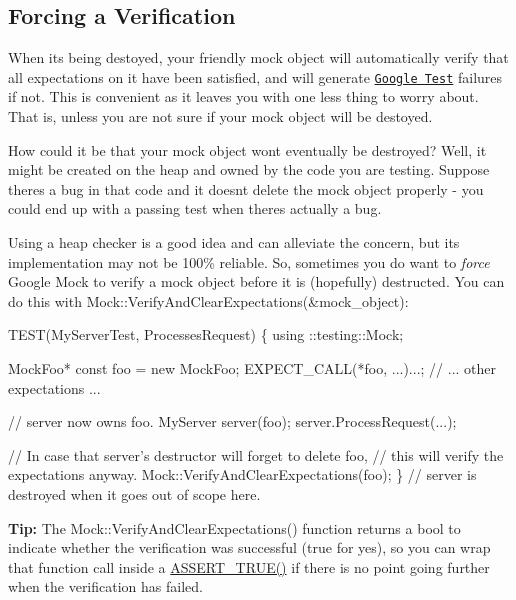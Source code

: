 \subsection*{Forcing a Verification}

When it\textquotesingle{}s being destoyed, your friendly mock object will automatically verify that all expectations on it have been satisfied, and will generate \href{http://code.google.com/p/googletest/}{\tt Google Test} failures if not. This is convenient as it leaves you with one less thing to worry about. That is, unless you are not sure if your mock object will be destoyed.

How could it be that your mock object won\textquotesingle{}t eventually be destroyed? Well, it might be created on the heap and owned by the code you are testing. Suppose there\textquotesingle{}s a bug in that code and it doesn\textquotesingle{}t delete the mock object properly -\/ you could end up with a passing test when there\textquotesingle{}s actually a bug.

Using a heap checker is a good idea and can alleviate the concern, but its implementation may not be 100\% reliable. So, sometimes you do want to {\itshape force} Google Mock to verify a mock object before it is (hopefully) destructed. You can do this with {\ttfamily Mock\+::\+Verify\+And\+Clear\+Expectations(\&mock\+\_\+object)}\+:


\begin{DoxyCode}
TEST(MyServerTest, ProcessesRequest) \{
  using ::testing::Mock;

  MockFoo* const foo = new MockFoo;
  EXPECT\_CALL(*foo, ...)...;
  // ... other expectations ...

  // server now owns foo.
  MyServer server(foo);
  server.ProcessRequest(...);

  // In case that server's destructor will forget to delete foo,
  // this will verify the expectations anyway.
  Mock::VerifyAndClearExpectations(foo);
\}  // server is destroyed when it goes out of scope here.
\end{DoxyCode}


{\bfseries Tip\+:} The {\ttfamily Mock\+::\+Verify\+And\+Clear\+Expectations()} function returns a {\ttfamily bool} to indicate whether the verification was successful ({\ttfamily true} for yes), so you can wrap that function call inside a {\ttfamily \hyperlink{gtest_8h_ae9244bfbda562e8b798789b001993fa5}{A\+S\+S\+E\+R\+T\+\_\+\+T\+R\+U\+E()}} if there is no point going further when the verification has failed.


